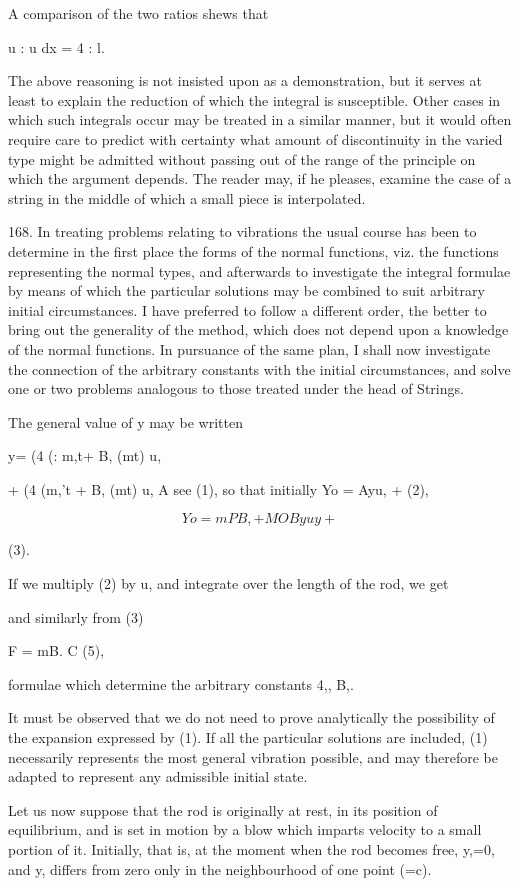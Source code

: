 A comparison of the two ratios shews that

u : u dx = 4 : l.

The above reasoning is not insisted upon as a demonstration, but it
serves at least to explain the reduction of which the integral is
susceptible. Other cases in which such integrals occur may be treated in
a similar manner, but it would often require care to predict with
certainty what amount of discontinuity in the varied type might be
admitted without passing out of the range of the principle on which the
argument depends. The reader may, if he pleases, examine the case of a
string in the middle of which a small piece is interpolated.

168. In treating problems relating to vibrations the usual course has been to
determine in the first place the forms of the normal functions, viz. the
functions representing the normal types, and afterwards to investigate the
integral formulae by means of which the particular solutions may be combined to
suit arbitrary initial circumstances. I have preferred to follow a different
order, the better to bring out the generality of the method, which does not
depend upon a knowledge of the normal functions. In pursuance of the same plan,
I shall now investigate the connection of the arbitrary constants with the
initial circumstances, and solve one or two problems analogous to those treated
under the head of Strings.

The general value of y may be written

y= (4 (: m,t+ B, (mt) u,

+ (4 (m,'t + B, (mt) u, A see (1), so that initially Yo = Ayu, + (2),

\[Yo =  m PB, + MO B y u y +\]

(3).

If we multiply (2) by u, and integrate over the length of the rod, we
get

and similarly from (3)

F = mB. C (5),

formulae which determine the arbitrary constants 4,, B,.

It must be observed that we do not need to prove analytically the
possibility of the expansion expressed by (1). If all the particular
solutions are included, (1) necessarily represents the most general
vibration possible, and may therefore be adapted to represent any
admissible initial state.

Let us now suppose that the rod is originally at rest, in its position
of equilibrium, and is set in motion by a blow which imparts velocity to
a small portion of it. Initially, that is, at the moment when the rod
becomes free, y,=0, and y, differs from zero only in the neighbourhood
of one point (=c).

